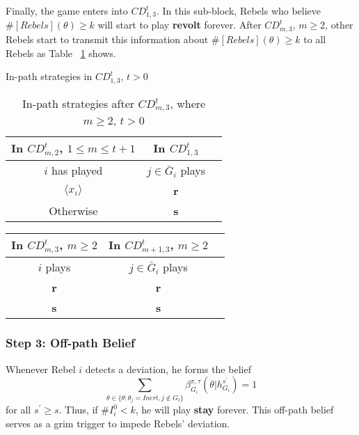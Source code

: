 \documentclass[12pt,letterpaper]{article}
\theoremstyle{definition}
\theoremstyle{remark}
\theoremstyle{claim}
\begin{document}
Finally, the game enters into $CD^t_{1,3}$. In this sub-block, Rebels who believe $\#[Rebels](\theta)\geq k$ will start to play \textbf{revolt} forever. After $CD^t_{m,3}$, $m\geq 2$, other Rebels start to transmit this information about $\#[Rebels](\theta)\geq k$ to all Rebels as Table ~\ref{Table_stg_cdm3} shows.

\begin{table}[ht]
\caption{In-path strategies in $CD^t_{1,3}$, $t>0$}
\label{Table_stg_cd13}
\begin{center}
\begin{tabular}{c c c}
In $CD^t_{m,2}$, $1\leq m\leq t+1$ 	 	&  	In $CD^t_{1,3}$		& 	\\
\hline
\hline
$i$ has played 		  							&  $j\in \bar{G}_{i}$ plays  								& \\
\hline
$\langle x_i \rangle$ 	& 	\textbf{r}	    &  \\
Otherwise		&  \textbf{s}	&  \\

\end{tabular}
\caption{In-path strategies after $CD^t_{m,3}$, where $m\geq 2$, $t>0$}
\label{Table_stg_cdm3}
\end{center}
\end{table}

\begin{table}[ht]
\begin{center}
\begin{tabular}{c c c}
In $CD^t_{m,3}$, $m\geq 2$ 	 	&  	In $CD^t_{m+1,3}$, $m\geq 2$		& 	\\
\hline
\hline
$i$ plays 		  							&  $j\in \bar{G}_{i}$ plays  								& \\
\hline
\textbf{r} 	& 	\textbf{r}	    &  \\
\textbf{s}		&  \textbf{s}	&  \\

\end{tabular}
\end{center}
\end{table}



\subsubsection{Step 3: Off-path Belief}

Whenever Rebel $i$ detects a deviation, he forms the belief 
\begin{equation}
\label{eq_grim_trigger}
\sum_{\theta \in \{\theta:\theta_j=Inert,j\notin G_i\}}\beta^{\pi,\tau}_{G_i}({\theta}|h^{s^{'}}_{G_i})=1
\end{equation}
for all $s^{'}\geq s$. Thus, if $\# I^0_i<k$, he will play \textbf{stay} forever. This off-path belief serves as a grim trigger to impede Rebels' deviation. 
\end{document}
